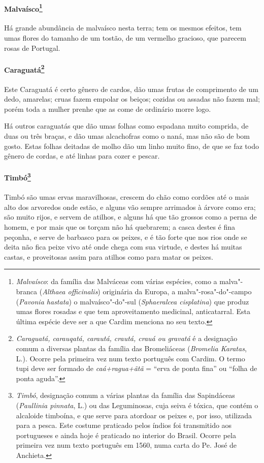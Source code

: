 \paragraph{Malvaísco\footnote{ \textit{Malvaísco}: da família das
Malváceas com várias espécies, como a malva"-branca (\textit{Althaea
officinalis}) originária da Europa, a malva"-rosa"-do"-campo 
(\textit{Pavonia hastata}) o malvaísco"-do"-sul (\textit{Sphaeralcea
cisplatina}) que produz umas flores rosadas e que tem aproveitamento
medicinal, anticatarral. Esta última espécie deve ser a que Cardim
menciona no seu texto.}} Há grande abundância de malvaísco
nesta terra; tem os mesmos efeitos, tem umas flores do tamanho de um
tostão, de um vermelho gracioso, que parecem rosas de Portugal.

\paragraph{Caraguatá\footnote{ \textit{Caraguatá, carauqatá, carautá,
crautá, crauá ou gravatá} é a designação comum a diversas plantas da
família das Bromeliáceas (\textit{Bromelia Karatas}, L.). Ocorre pela
primeira vez num texto português com Cardim. O termo tupi deve ser
formado de \textit{caá+ragua+ãtã} = ``erva de ponta fina'' ou ``folha de
ponta aguda''.}} Este Caraguatá é certo gênero de cardos,
dão umas frutas de comprimento de um dedo, amarelas; cruas fazem
empolar os beiços; cozidas ou assadas não fazem mal; porém toda a
mulher prenhe que as come de ordinário morre logo.

 Há outros caraguatás que dão umas folhas como espadana muito comprida,
de duas ou três braças, e dão umas alcachofras como o naná, mas não são
de bom gosto. Estas folhas deitadas de molho dão um linho muito fino,
de que se faz todo gênero de cordas, e até linhas para cozer e pescar. 

\paragraph{Timbó\footnote{ \textit{Timbó}, designação comum a várias
plantas da família das Sapindáceas (\textit{Paullinia pinnata}, L.) 
ou das Leguminosas, cuja seiva é tóxica, que contém o
alcaloide timboína, e que serve para atordoar os peixes e, por isso,
utilizada para a pesca. Este costume praticado pelos índios foi
transmitido aos portugueses e ainda hoje é praticado no interior do
Brasil. Ocorre pela primeira vez num texto português em 1560, numa
carta do Pe. José de Anchieta.}} Timbó são umas
ervas maravilhosas, crescem do chão como cordões até o mais alto dos
arvoredos onde estão, e alguns vão sempre arrimados à árvore como era;
são muito rijos, e servem de atilhos, e alguns há que tão grossos como a
perna de homem, e por mais que os torçam não há quebrarem; a casca
destes é fina peçonha, e serve de barbasco para os peixes, e é tão
forte que nos rios onde se deita não fica peixe vivo até onde chega
com sua virtude, e destes há muitas castas, e proveitosas assim para
atilhos como para matar os peixes. 

